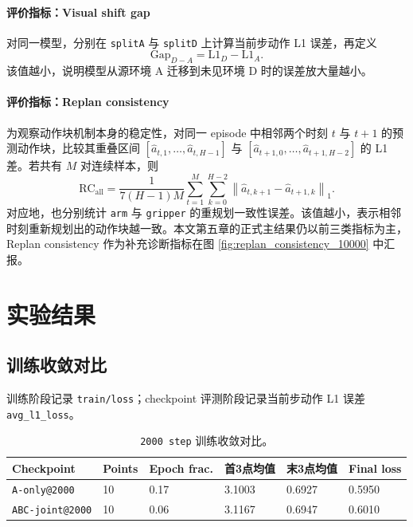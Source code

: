 \documentclass{article}
\begin{document}
\paragraph{评价指标：Visual shift gap}
对同一模型，分别在 \texttt{splitA} 与 \texttt{splitD} 上计算当前步动作 L1 误差，再定义
\[
\mathrm{Gap}_{D-A}=\mathrm{L1}_{D}-\mathrm{L1}_{A}.
\]
该值越小，说明模型从源环境 A 迁移到未见环境 D 时的误差放大量越小。

\paragraph{评价指标：Replan consistency}
为观察动作块机制本身的稳定性，对同一 episode 中相邻两个时刻 $t$ 与 $t+1$ 的预测动作块，比较其重叠区间
$[\hat{a}_{t,1},\ldots,\hat{a}_{t,H-1}]$ 与 $[\hat{a}_{t+1,0},\ldots,\hat{a}_{t+1,H-2}]$ 的 L1 差。若共有 $M$ 对连续样本，则
\[
\mathrm{RC}_{\text{all}}=
\frac{1}{7(H-1)M}
\sum_{t=1}^{M}
\sum_{k=0}^{H-2}
\left\|\hat{a}_{t,k+1}-\hat{a}_{t+1,k}\right\|_1.
\]
对应地，也分别统计 \texttt{arm} 与 \texttt{gripper} 的重规划一致性误差。该值越小，表示相邻时刻重新规划出的动作块越一致。本文第五章的正式主结果仍以前三类指标为主，Replan consistency 作为补充诊断指标在图 \ref{fig:replan_consistency_10000} 中汇报。

\section{实验结果}

\subsection{训练收敛对比}

训练阶段记录 \texttt{train/loss}；checkpoint 评测阶段记录当前步动作 L1 误差 \texttt{avg\_l1\_loss}。

\begin{table}[H]
  \centering
  \small
  \caption{\texttt{2000 step} 训练收敛对比。}
  \label{tab:train_summary}
  \begin{tabular}{L{2.7cm}C{1.1cm}C{1.3cm}C{1.5cm}C{1.5cm}C{1.3cm}}
    \toprule
    Checkpoint & Points & Epoch frac. & 首3点均值 & 末3点均值 & Final loss \\
    \midrule
    \texttt{A-only@2000} & 10 & 0.17 & 3.1003 & 0.6927 & 0.5950 \\
    \texttt{ABC-joint@2000} & 10 & 0.06 & 3.1167 & 0.6947 & 0.6010 \\
    \bottomrule
  \end{tabular}
\end{table}
\end{document}
